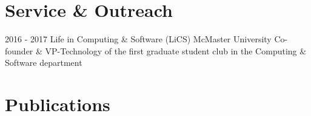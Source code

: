 \documentclass[letterpaper]{twentysecondcv} %
\begin{document}
\vspace{-.5em}
\section{Service \& Outreach}
\vspace{-.5em}
\begin{twenty}
	\twentyitem
	{2016 -}
	{2017}
	{Life in Computing \& Software (LiCS)}
	{McMaster University}
	{}
	{Co-founder \& VP-Technology of the first graduate student club in the Computing \& Software department}
\end{twenty}

\vspace{-.5em}
\section{Publications}
\vspace{-.5em}
\printbibliography[heading=none]
\end{document}
